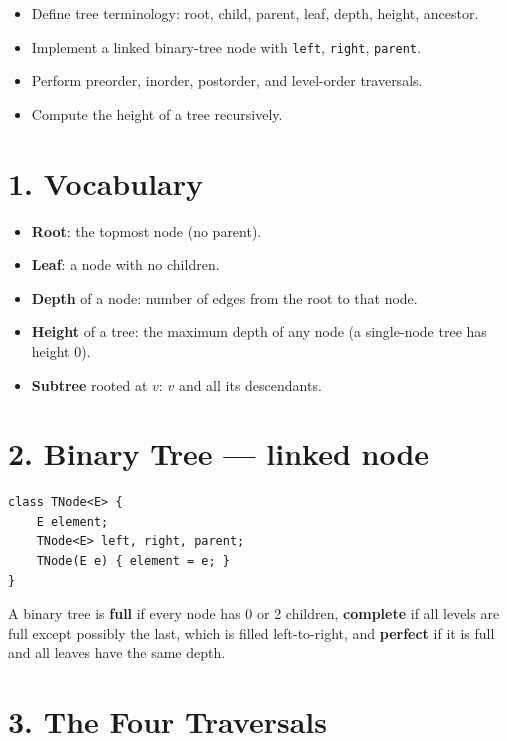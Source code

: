 \documentclass[11pt]{article}
\begin{document}

\begin{objbox}
\begin{itemize}[leftmargin=*]
  \item Define tree terminology: root, child, parent, leaf, depth, height, ancestor.
  \item Implement a linked binary-tree node with \texttt{left}, \texttt{right}, \texttt{parent}.
  \item Perform preorder, inorder, postorder, and level-order traversals.
  \item Compute the height of a tree recursively.
\end{itemize}
\end{objbox}

\section*{1. Vocabulary}

\begin{itemize}[leftmargin=*]
  \item \textbf{Root}: the topmost node (no parent).
  \item \textbf{Leaf}: a node with no children.
  \item \textbf{Depth} of a node: number of edges from the root to that node.
  \item \textbf{Height} of a tree: the maximum depth of any node (a single-node tree has height 0).
  \item \textbf{Subtree} rooted at $v$: $v$ and all its descendants.
\end{itemize}

\section*{2. Binary Tree --- linked node}

\begin{lstlisting}
class TNode<E> {
    E element;
    TNode<E> left, right, parent;
    TNode(E e) { element = e; }
}
\end{lstlisting}

A binary tree is \textbf{full} if every node has 0 or 2 children, \textbf{complete} if all levels are full except possibly the last, which is filled left-to-right, and \textbf{perfect} if it is full and all leaves have the same depth.

\section*{3. The Four Traversals}
\end{document}
